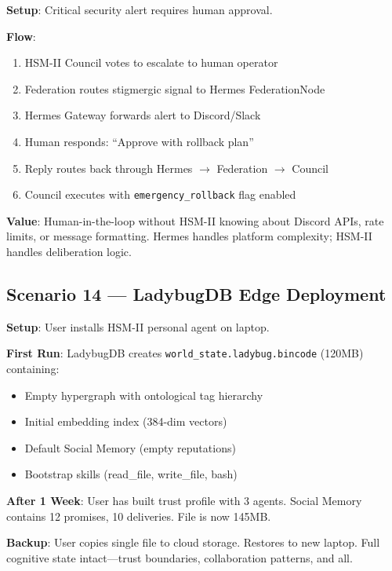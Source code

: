 \documentclass[11pt]{article}
\begin{document}
\noindent\textbf{Setup}: Critical security alert requires human approval.

\noindent\textbf{Flow}:
\begin{enumerate}[noitemsep,topsep=2pt]
  \item HSM-II Council votes to escalate to human operator
  \item Federation routes stigmergic signal to Hermes FederationNode
  \item Hermes Gateway forwards alert to Discord/Slack
  \item Human responds: ``Approve with rollback plan''
  \item Reply routes back through Hermes $\rightarrow$ Federation $\rightarrow$ Council
  \item Council executes with \texttt{emergency\_rollback} flag enabled
\end{enumerate}

\noindent\textbf{Value}: Human-in-the-loop without HSM-II knowing about Discord
APIs, rate limits, or message formatting. Hermes handles platform complexity;
HSM-II handles deliberation logic.

\subsection{Scenario 14 --- LadybugDB Edge Deployment}

\noindent\textbf{Setup}: User installs HSM-II personal agent on laptop.

\noindent\textbf{First Run}: LadybugDB creates \texttt{world\_state.ladybug.bincode}
(120MB) containing:
\begin{itemize}[noitemsep,topsep=2pt]
  \item Empty hypergraph with ontological tag hierarchy
  \item Initial embedding index (384-dim vectors)
  \item Default Social Memory (empty reputations)
  \item Bootstrap skills (read\_file, write\_file, bash)
\end{itemize}

\noindent\textbf{After 1 Week}: User has built trust profile with 3 agents.
Social Memory contains 12 promises, 10 deliveries. File is now 145MB.

\noindent\textbf{Backup}: User copies single file to cloud storage. Restores to
new laptop. Full cognitive state intact---trust boundaries, collaboration
patterns, and all.
\end{document}
